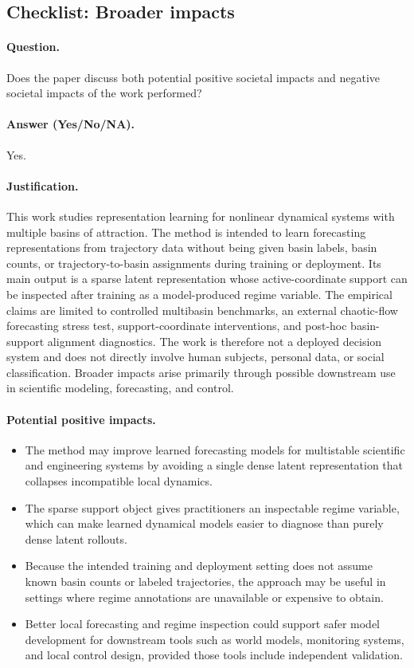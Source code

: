 \subsection{Checklist: Broader impacts}
\label{app:checklist_broader_impacts}

\paragraph{Question.}
Does the paper discuss both potential positive societal impacts and negative societal impacts of the work performed?

\paragraph{Answer (Yes/No/NA).}
Yes.

\paragraph{Justification.}
This work studies representation learning for nonlinear dynamical systems with multiple basins of attraction. The method is intended to learn forecasting representations from trajectory data without being given basin labels, basin counts, or trajectory-to-basin assignments during training or deployment. Its main output is a sparse latent representation whose active-coordinate support can be inspected after training as a model-produced regime variable. The empirical claims are limited to controlled multibasin benchmarks, an external chaotic-flow forecasting stress test, support-coordinate interventions, and post-hoc basin-support alignment diagnostics. The work is therefore not a deployed decision system and does not directly involve human subjects, personal data, or social classification. Broader impacts arise primarily through possible downstream use in scientific modeling, forecasting, and control.

\paragraph{Potential positive impacts.}
\begin{itemize}
  \item The method may improve learned forecasting models for multistable scientific and engineering systems by avoiding a single dense latent representation that collapses incompatible local dynamics.
  \item The sparse support object gives practitioners an inspectable regime variable, which can make learned dynamical models easier to diagnose than purely dense latent rollouts.
  \item Because the intended training and deployment setting does not assume known basin counts or labeled trajectories, the approach may be useful in settings where regime annotations are unavailable or expensive to obtain.
  \item Better local forecasting and regime inspection could support safer model development for downstream tools such as world models, monitoring systems, and local control design, provided those tools include independent validation.
\end{itemize}


